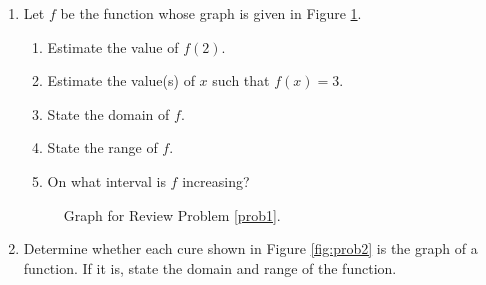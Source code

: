 \begin{enumerate}


\item Let \(f\) be the function whose graph is given in Figure \ref{fig:prob1}. \label{prob1}
\begin{enumerate}

\item Estimate the value of \(f(2)\).
\item Estimate the value(s) of \(x\) such that \(f(x) = 3\).
\item State the domain of \(f\).
\item State the range of \(f\).
\item On what interval is \(f\) increasing?
\end{enumerate}


\begin{figure}[!h]
\centering
{}

\caption{Graph for Review Problem \ref{prob1}.}
\label{fig:prob1}

\end{figure}

\item Determine whether each cure shown in Figure \ref{fig:prob2} is the graph of a function. If it is, state the domain and range of the function.\label{prob2}



\end{enumerate}

